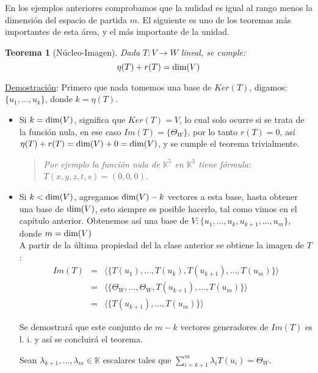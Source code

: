 \documentclass[12pt]{book}
\newtheorem{teo}{Teorema}
\def\pq{\vspace{0.5cm}}
\def\K{\mathbb{K}}
\def\dim{\textup{dim}}
\begin{document}
En los ejemplos anteriores comprobamos que la nulidad es igual al rango menos la dimensión del espacio de partida $m$.
El siguiente es uno de los teoremas más importantes de esta área, y el más importante de la unidad.

\begin{teo}[Núcleo-Imagen]
Dada $T:V\rightarrow W$ lineal, se cumple:
$$ \eta(T)+r(T)=\dim(V)$$
\end{teo}
\underline{Demostración}:
  Primero que nada tomemos una base de $Ker(T)$, digamos: $\{u_1,\dots,u_k\}$, donde $k=\eta(T)$.
  \begin{itemize}
  \item Si $k=\dim(V)$, significa que $Ker(T)=V$, lo cual solo ocurre si se trata de la función nula, en ese caso $Im(T)=\{\Theta_W\}$, por lo tanto $r(T)=0$, así $\eta(T)+r(T)=\dim(V)+0=\dim(V)$, y se cumple el teorema trivialmente.

  \pq 

  \begin{quote}{\em Por ejemplo la función nula de $\K^5$ en $\K^3$ tiene fórmula: $T(x,y,z,t,s)=(0,0,0)$.}\end{quote}
      
  \item Si $k<\dim(V)$, agregamos $\dim(V)-k$ vectores a esta base, hasta obtener una base de $\dim(V)$, esto siempre es posible hacerlo, tal como vimos en el capítulo anterior.
  Obtenemos así una base de $V: \{u_1,\dots,u_k, u_{k+1},\dots,u_m\}$, donde $m=\dim(V)$\\

    A partir de la última propiedad del la clase anterior se obtiene la imagen de $T$:
    \begin{eqnarray*}
      Im(T)&=&\langle\{T(u_1),\dots,T(u_k),T(u_{k+1}),\dots,T(u_m)\}\rangle\\
      &=&\langle\{\Theta_W,\dots,\Theta_W,T(u_{k+1}),\dots,T(u_m)\}\rangle\\
      &=&\langle\{T(u_{k+1}),\dots,T(u_m)\}\rangle
    \end{eqnarray*}
    
    Se demostrar\'a que este conjunto de $m-k$ vectores generadores de $Im(T)$ es l. i. y así se concluirá el teorema.

    Sean $\lambda_{k+1},\dots,\lambda_m\in\K$ escalares tales que ${\displaystyle \sum_{i=k+1}^m\lambda_iT(u_i)=\Theta_W}$.
    

\end{itemize}
\end{document}
